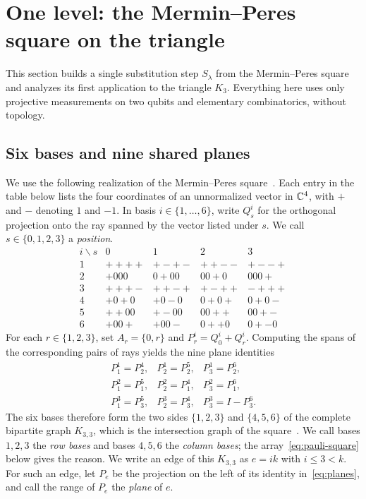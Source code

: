 \section{One level: the Mermin--Peres square on the triangle}\label{sec:construction}

This section builds a single substitution step $S_\lambda$ from the Mermin--Peres square and analyzes its first application to the triangle $K_3$. Everything here uses only projective measurements on two qubits and elementary combinatorics, without topology.

\subsection{Six bases and nine shared planes}\label{sec:square}

We use the following realization of the Mermin--Peres square~\cite{Mermin,Peres}. Each entry in the table below lists the four coordinates of an unnormalized vector in $\mathbb C^4$, with $+$ and $-$ denoting $1$ and $-1$. In basis $i\in\{1,\ldots,6\}$, write $Q^i_s$ for the orthogonal projection onto the ray spanned by the vector listed under $s$. We call $s\in\{0,1,2,3\}$ a \emph{position}.
\[
\begin{array}{c|cccc}
 i\backslash s&0&1&2&3\\ \hline
 1& ++++ & +-+- & ++-- & +--+\\
 2& +000 & 0+00 & 00+0 & 000+\\
 3& +++- & ++-+ & +-++ & -+++\\
 4& +0+0 & +0-0 & 0+0+ & 0+0-\\
 5& ++00 & +-00 & 00++ & 00+-\\
 6& +00+ & +00- & 0++0 & 0+-0
\end{array}
\]
For each $r\in\{1,2,3\}$, set $A_r=\{0,r\}$ and $P^i_r=Q^i_0+Q^i_r$. Computing the spans of the corresponding pairs of rays yields the nine plane identities
\begin{equation}\label{eq:planes}
\begin{array}{ccc}
 P^1_1=P^4_2,&P^1_2=P^5_2,&P^1_3=P^6_2,\\
 P^2_1=P^5_1,&P^2_2=P^4_1,&P^2_3=P^6_1,\\
 P^3_1=P^5_3,&P^3_2=P^4_3,&P^3_3=I-P^6_3 .
\end{array}
\end{equation}
The six bases therefore form the two sides $\{1,2,3\}$ and $\{4,5,6\}$ of the complete bipartite graph $K_{3,3}$, which is the intersection graph of the square~\cite[Example~20]{Arkhipov}. We call bases $1,2,3$ the \emph{row bases} and bases $4,5,6$ the \emph{column bases}; the array~\eqref{eq:pauli-square} below gives the reason. We write an edge of this $K_{3,3}$ as $e=ik$ with $i\le3<k$. For such an edge, let $P_e$ be the projection on the left of its identity in~\eqref{eq:planes}, and call the range of $P_e$ the \emph{plane} of $e$.

